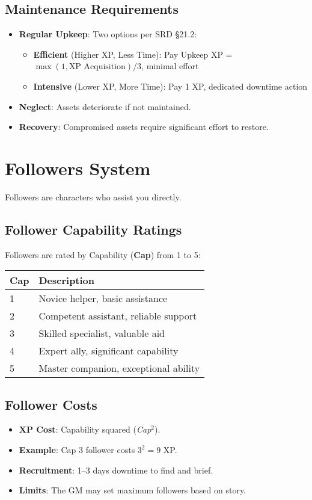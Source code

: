 \subsection*{Maintenance Requirements}
\begin{itemize}
\item \textbf{Regular Upkeep}: Two options per SRD §21.2:
      \begin{itemize}
      \item \textbf{Efficient} (Higher XP, Less Time): Pay Upkeep XP = $\max(1, \text{XP Acquisition})/3$, minimal effort
      \item \textbf{Intensive} (Lower XP, More Time): Pay 1 XP, dedicated downtime action
      \end{itemize}
\item \textbf{Neglect}: Assets deteriorate if not maintained.
\item \textbf{Recovery}: Compromised assets require significant effort to restore.
\end{itemize}

\section{Followers System}

Followers are characters who assist you directly.

\subsection*{Follower Capability Ratings}
Followers are rated by Capability (\textbf{Cap}) from 1 to 5:
\begin{center}
\small
\begin{tabular}{ll}
\toprule
\textbf{Cap} & \textbf{Description} \\
\midrule
1 & Novice helper, basic assistance \\
2 & Competent assistant, reliable support \\
3 & Skilled specialist, valuable aid \\
4 & Expert ally, significant capability \\
5 & Master companion, exceptional ability \\
\bottomrule
\end{tabular}
\end{center}

\subsection*{Follower Costs}
\begin{itemize}
\item \textbf{XP Cost}: Capability squared (\emph{Cap}$^2$).
\item \textbf{Example}: Cap 3 follower costs $3^2=9$ XP.
\item \textbf{Recruitment}: 1--3 days downtime to find and brief.
\item \textbf{Limits}: The GM may set maximum followers based on story.
\end{itemize}

